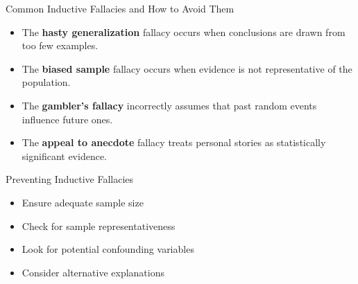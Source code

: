 \documentclass{beamer}
\begin{document}
\begin{frame}{Common Inductive Fallacies and How to Avoid Them}
    \begin{itemize}
        \item The \textbf{hasty generalization} fallacy occurs when conclusions are drawn from too few examples.
        \item The \textbf{biased sample} fallacy occurs when evidence is not representative of the population.
        \item The \textbf{gambler's fallacy} incorrectly assumes that past random events influence future ones.
        \item The \textbf{appeal to anecdote} fallacy treats personal stories as statistically significant evidence.
    \end{itemize}
    
    \begin{block}{Preventing Inductive Fallacies}
        \begin{itemize}
            \item Ensure adequate sample size
            \item Check for sample representativeness
            \item Look for potential confounding variables
            \item Consider alternative explanations
        \end{itemize}
    \end{block}
\end{frame}
\end{document}

